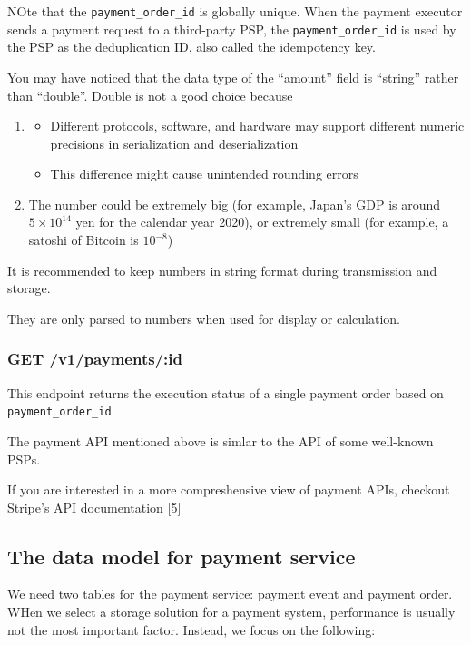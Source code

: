 \documentclass{report}
\theoremstyle{definition}
\let\oldsubsection\subsection
\let\oldsubsubsection\subsubsection
\renewcommand{\subsection}{\oldsubsection*}
\renewcommand{\subsubsection}{\oldsubsubsection*}
\begin{document}
NOte that the \lstinline|payment_order_id| is globally unique. When the payment executor sends a payment request  to a third-party PSP, the \lstinline|payment_order_id| is used by the PSP as the deduplication ID, also called the idempotency key.

You may have noticed that the data type of the ``amount'' field is ``string'' rather than ``double''. Double is not a good choice because

\begin{enumerate}
\item

\begin{itemize}
\item
Different protocols, software, and hardware may support different numeric precisions in serialization and deserialization
\item
This difference might cause unintended rounding errors
\end{itemize}
\item

The number could be extremely big (for example, Japan's GDP is around $5 \times 10^{14}$ yen for the calendar year 2020), or extremely small (for example, a satoshi of Bitcoin is $10^{-8}$)
\end{enumerate}

It is recommended to keep numbers in string format during transmission and storage.

They are only parsed to numbers when used for display or calculation.

\subsubsection{GET /v1/payments/{:id}}

This endpoint returns the execution status of a single payment order based on \lstinline|payment_order_id|.

The payment API mentioned above is simlar to the API of some well-known PSPs.

If you are interested in a more compreshensive view of payment APIs, checkout Stripe's API documentation [5]

\subsection{The data model for payment service}

We need two tables for the payment service: payment event and payment order. WHen we select a storage solution for a payment system, performance is usually not the most important factor. Instead, we focus on the following:
\end{document}
